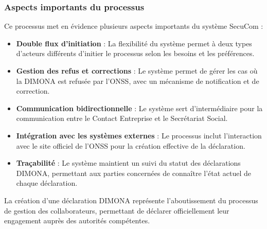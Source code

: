 \subsubsection{Aspects importants du processus}

Ce processus met en évidence plusieurs aspects importants du système SecuCom :

\begin{itemize}
  \item \textbf{Double flux d'initiation} : La flexibilité du système permet à deux types d'acteurs différents d'initier le processus selon les besoins et les préférences.
  \item \textbf{Gestion des refus et corrections} : Le système permet de gérer les cas où la DIMONA est refusée par l'ONSS, avec un mécanisme de notification et de correction.
  \item \textbf{Communication bidirectionnelle} : Le système sert d'intermédiaire pour la communication entre le Contact Entreprise et le Secrétariat Social.
  \item \textbf{Intégration avec les systèmes externes} : Le processus inclut l'interaction avec le site officiel de l'ONSS pour la création effective de la déclaration.
  \item \textbf{Traçabilité} : Le système maintient un suivi du statut des déclarations DIMONA, permettant aux parties concernées de connaître l'état actuel de chaque déclaration.
\end{itemize}

La création d'une déclaration DIMONA représente l'aboutissement du processus de gestion des collaborateurs, permettant de déclarer officiellement leur engagement auprès des autorités compétentes.



